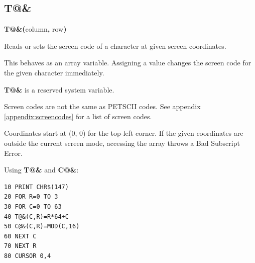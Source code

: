 \subsection{T@\&}
\begin{description}[leftmargin=2cm,style=nextline]
\item [Format:] {\bf T@\&(}column{\bf ,} row{\bf)}
\item [Usage:] Reads or sets the screen code of a character at given screen coordinates.

   This behaves as an array variable. Assigning a value changes the screen code for the given character immediately.

\item[Remarks:] {\bf T@\&} is a reserved system variable.

   Screen codes are not the same as PETSCII codes. See appendix \vref{appendix:screencodes} for a list of screen codes.

   Coordinates start at (0, 0) for the top-left corner. If the given coordinates are outside the current screen mode, accessing the array throws a Bad Subscript Error.

\item [Example:] Using {\bf T@\&} and {\bf C@\&}:
\begin{tcolorbox}[colback=black,coltext=white]
\verbatimfont{\codefont}
\begin{verbatim}
10 PRINT CHR$(147)
20 FOR R=0 TO 3
30 FOR C=0 TO 63
40 T@&(C,R)=R*64+C
50 C@&(C,R)=MOD(C,16)
60 NEXT C
70 NEXT R
80 CURSOR 0,4
\end{verbatim}
\end{tcolorbox}

\end{description}




\newpage
